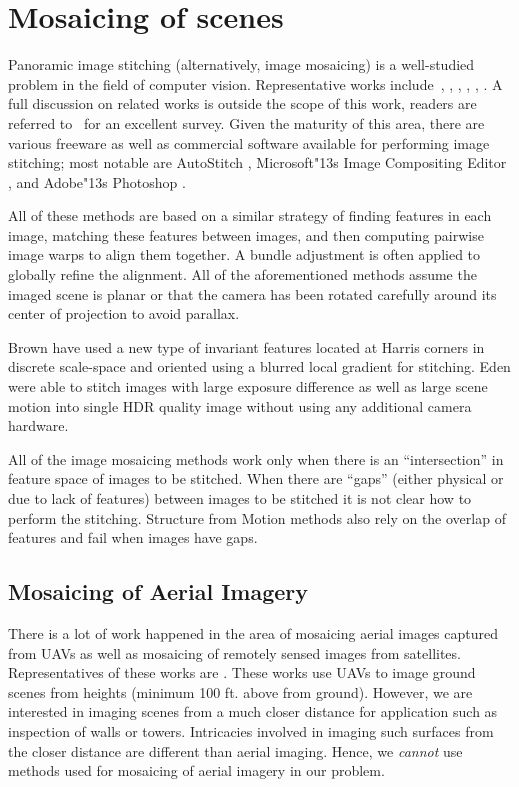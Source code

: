\section{Mosaicing of scenes}
Panoramic image stitching (alternatively, image mosaicing) is a
well-studied problem in the field of computer vision.  Representative
works include~\cite{Milgram1975}, \cite{Milgram1977}, \cite{Capel},
\cite{Szeliski1997}, \cite{Brown07}, \cite{Brown03}.  A full discussion
on related works is outside the scope of this work, readers are
referred to~\cite{Szeliski05imagealignment} for an excellent survey.
Given the maturity of this area, there are various freeware as well as
commercial software available for performing image stitching; most
notable are AutoStitch \cite{autostitch}, Microsoft\textsc{\char"13}s Image
Compositing Editor \cite{ICE}, and Adobe\textsc{\char"13}s Photoshop
\cite{photoshop}.

All of these methods are based on a similar strategy of finding
features in each image, matching these features between images, and
then computing pairwise image warps to align them together.  A 
bundle adjustment is often applied to globally refine the alignment.
All of the aforementioned methods assume the imaged scene is planar or
that the camera has been rotated carefully around its center of
projection to avoid parallax.

Brown \etal \cite{Brown05} have used a new type of invariant features
located at Harris corners in discrete scale-space and oriented using a
blurred local gradient for stitching. Eden \etal \cite{Eden} were
able to stitch images with large exposure difference as well as large
scene motion into single HDR quality image without using any
additional camera hardware.

All of the image mosaicing methods work only when there is an
``intersection'' in feature space of images to be stitched. When there
are ``gaps'' (either physical or due to lack of features) between
images to be stitched it is not clear how to perform the
stitching. Structure from Motion methods also rely on the overlap of
features and fail when images have gaps.

\subsection{Mosaicing of Aerial Imagery}
There is a lot of work happened in the area of mosaicing aerial images
captured from UAVs as well as mosaicing of remotely sensed images from satellites.
Representatives of these works are \cite{Yue, Yuanhang, Yahyanejad, Zhu}.
These works use UAVs to image ground scenes from heights (minimum 100 ft.
above from ground). However, we are interested in imaging scenes from a much closer
distance for application such as inspection of walls or towers. Intricacies
involved in imaging such surfaces from the closer distance are different than aerial
imaging. Hence, we \textit{cannot} use methods used for mosaicing of aerial 
imagery in our problem.
